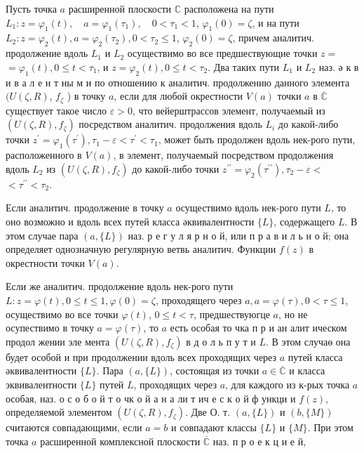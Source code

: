 \documentclass[10pt]{article}
\begin{document}
Пусть точка $a$ расширенной плоскости $\mathbb{C}$ расположена на пути $L_{1}: z=\varphi_{1}(t), \quad a=\varphi_{1}\left(\tau_{1}\right), \quad 0<\tau_{1}<1$, $\varphi_{1}(0)=\zeta$, и на пути $L_{2}: z=\varphi_{2}(t), a=\varphi_{2}\left(\tau_{2}\right), 0<\tau_{2} \leqslant 1$, $\varphi_{2}(0)=\zeta$, причем аналитич. продолжение вдоль $L_{1}$ и $L_{2}$ осуществимо во все предшествующие точки $z=$ $=\varphi_{1}(t), 0 \leqslant t<\tau_{1}$, и $z=\varphi_{2}(t), 0 \leqslant t<\tau_{2}$. Два таких пути $L_{1}$ и $L_{2}$ наз. ә к в и в а л е н т ны м и по отношению к аналитич. продолжению данного элемента $(U(\zeta, R)$, $f_{\zeta}$ ) в точку $a$, если для любой окрестности $V(a)$ точки $a$ в $\overline{\mathbb{C}}$ существует такое число $\varepsilon>0$, что вейерштрассов элемент, получаемый из $\left(U(\zeta, R), f_{\zeta}\right)$ посредством аналитич. продолжения вдоль $L_{i}$ до какой-либо точки $z^{\prime}=\varphi_{1}\left(\tau^{\prime}\right), \tau_{1}-\varepsilon<\tau^{\prime}<\tau_{1}$, может быть продолжен вдоль нек-рого пути, расположенного в $V(a)$, в элемент, получаемый посредством продолжения вдоль $L_{2}$ из $\left(U(\zeta, R), f_{\zeta}\right)$ до какой-либо точки $z^{\prime \prime}=\varphi_{2}\left(\tau^{\prime \prime}\right), \tau_{2}-\varepsilon<$ $<\tau^{\prime \prime}<\tau_{2}$.

Если аналитич. продолжение в точку $a$ осуществимо вдоль нек-рого пути $L$, то оно возможно и вдоль всех путей класса әквивалентности $\{L\}$, содержащего $L$. В этом случае пара $(a,\{L\})$ наз. р е г у л я р н о й, или п р а в и л ь н о й; она определяет однозначную регулярную ветвь аналитич. Функции $f(z)$ в окрестности точки $V(a)$.

Если же аналитич. продолжение вдоль нек-рого пути $L: z=\varphi(t), 0 \leqslant t \leqslant 1, \varphi(0)=\zeta$, проходящего через $a, a=\varphi(\tau), 0<\tau \leqslant 1$, осуществимо во все точки $\varphi(t)$, $0 \leqslant t<\tau$, предшествуюгце $a$, но не осупествимо в точку $a=\varphi(\tau)$, то $a$ есть особая то чка п р и ан алит ическом продол жении эле мента $\left(U(\zeta, R), f_{\zeta}\right)$ в д о л ь п у т и $L$. В этом случаө она будет особой и при продолжении вдоль всех проходящих через $a$ путей класса әквивалентности $\{L\}$. Пара $(a,\{L\})$, состоящая из точки $a \in \overline{\mathbb{C}}$ и класса эквивалентности $\{L\}$ путей $L$, проходящих через $a$, для каждого из к-рых точка $a$ особая, наз. о с о б о й т о чк о й а н а ли т ич е с к о й ф ункци и $f(z)$, определяемой элементом $\left(U(\zeta, R), f_{\zeta}\right)$. Две О. т. $(a,\{L\})$ и $(b,\{M\})$ считаются совпадающими, если $a=b$ и совпадают классы $\{L\}$ и $\{M\}$. При этом точка $a$ расширенной комплексной плоскости $\overline{\mathbb{C}}$ наз. п р о е к ц и е й,
\end{document}
